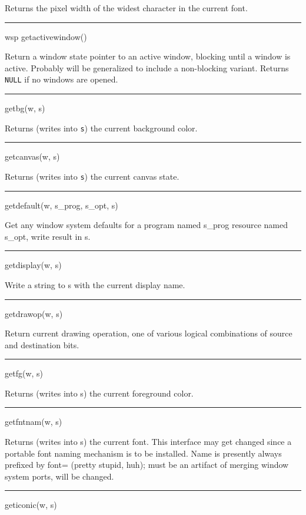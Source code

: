 Returns the pixel width of the widest character in the current font.


\bigskip\hrule\vspace{0.1cm}
\noindent
wsp getactivewindow()


Return a window state pointer to an active window, blocking until a
window is active. Probably will be generalized to include a
non-blocking variant. Returns \texttt{NULL} if no windows are opened.


\bigskip\hrule\vspace{0.1cm}
\noindent
getbg(w, s)


Returns (writes into \texttt{s}) the current background color.


\bigskip\hrule\vspace{0.1cm}
\noindent
getcanvas(w, s)


Returns (writes into \texttt{s}) the current canvas state.


\bigskip\hrule\vspace{0.1cm}
\noindent
getdefault(w, s\_prog, s\_opt, s)


Get any window system defaults for a program named s\_prog resource
named s\_opt, write result in s.


\bigskip\hrule\vspace{0.1cm}
\noindent
getdisplay(w, s)


Write a string to s with the current display name.


\bigskip\hrule\vspace{0.1cm}
\noindent
getdrawop(w, s)


Return current drawing operation, one of various logical combinations
of source and destination bits.


\bigskip\hrule\vspace{0.1cm}
\noindent
getfg(w, s)


Returns (writes into s) the current foreground color.


\bigskip\hrule\vspace{0.1cm}
\noindent
getfntnam(w, s)


Returns (writes into s) the current font. This interface may get
changed since a portable font naming mechanism is to be
installed. Name is presently always prefixed by
{\textquotedbl}font={\textquotedbl} (pretty stupid, huh); must be an
artifact of merging window system ports, will be changed.


\bigskip\hrule\vspace{0.1cm}
\noindent
geticonic(w, s)


